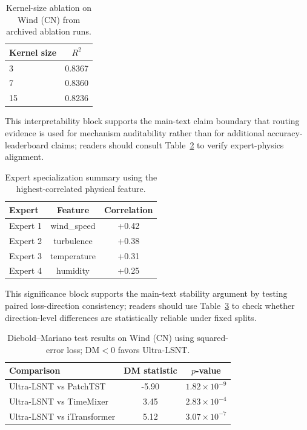 ﻿\documentclass[review,1p,times]{elsarticle}
\begin{document}
\begin{table}[t]
\centering
\caption{Kernel-size ablation on Wind (CN) from archived ablation runs.}
\label{tab:ablation_kernel}
\begin{tabular}{lc}
\toprule
Kernel size & $R^2$ \\
\midrule
3 & 0.8367 \\
7 & 0.8360 \\
15 & 0.8236 \\
\bottomrule
\end{tabular}
\end{table}

This interpretability block supports the main-text claim boundary that routing evidence is used for mechanism auditability rather than for additional accuracy-leaderboard claims; readers should consult Table~\ref{tab:expert_physics} to verify expert-physics alignment.
\begin{table}[t]
\centering
\caption{Expert specialization summary using the highest-correlated physical feature.}
\label{tab:expert_physics}
\begin{tabular}{lcc}
\toprule
Expert & Feature & Correlation \\
\midrule
Expert 1 & wind\_speed & +0.42 \\
Expert 2 & turbulence & +0.38 \\
Expert 3 & temperature & +0.31 \\
Expert 4 & humidity & +0.25 \\
\bottomrule
\end{tabular}
\end{table}

This significance block supports the main-text stability argument by testing paired loss-direction consistency; readers should use Table~\ref{tab:dm_test} to check whether direction-level differences are statistically reliable under fixed splits.
\begin{table}[t]
\centering
\caption{Diebold--Mariano test results on Wind (CN) using squared-error loss; DM$<0$ favors Ultra-LSNT.}
\label{tab:dm_test}
\begin{tabular}{lcc}
\toprule
Comparison & DM statistic & $p$-value \\
\midrule
Ultra-LSNT vs PatchTST & -5.90 & $1.82 \times 10^{-9}$ \\
Ultra-LSNT vs TimeMixer & 3.45 & $2.83 \times 10^{-4}$ \\
Ultra-LSNT vs iTransformer & 5.12 & $3.07 \times 10^{-7}$ \\
\bottomrule
\end{tabular}
\end{table}
\end{document}
